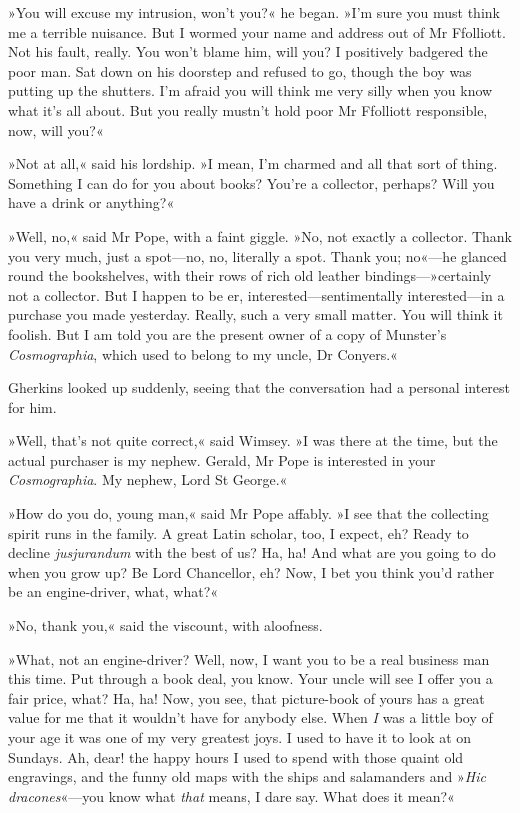 »You will excuse my intrusion, won't you?« he began. »I'm sure you must think me a terrible nuisance. But I wormed your name and address out of Mr Ffolliott. Not his fault, really. You won't blame him, will you? I positively badgered the poor man. Sat down on his doorstep and refused to go, though the boy was putting up the shutters. I'm afraid you will think me very silly when you know what it's all about. But you really mustn't hold poor Mr Ffolliott responsible, now, will you?«

»Not at all,« said his lordship. »I mean, I'm charmed and all that sort of thing. Something I can do for you about books? You're a collector, perhaps? Will you have a drink or anything?«

»Well, no,« said Mr Pope, with a faint giggle. »No, not exactly a collector. Thank you very much, just a spot—no, no, literally a spot. Thank you; no«—he glanced round the bookshelves, with their rows of rich old leather bindings—»certainly not a collector. But I happen to be er, interested—sentimentally interested—in a purchase you made yesterday. Really, such a very small matter. You will think it foolish. But I am told you are the present owner of a copy of Munster's \textit{Cosmographia}, which used to belong to my uncle, Dr Conyers.«

Gherkins looked up suddenly, seeing that the conversation had a personal interest for him.

»Well, that's not quite correct,« said Wimsey. »I was there at the time, but the actual purchaser is my nephew. Gerald, Mr Pope is interested in your \textit{Cosmographia}. My nephew, Lord St George.«

»How do you do, young man,« said Mr Pope affably. »I see that the collecting spirit runs in the family. A great Latin scholar, too, I expect, eh? Ready to decline \textit{jusjurandum} with the best of us? Ha, ha! And what are you going to do when you grow up? Be Lord Chancellor, eh? Now, I bet you think you'd rather be an engine-driver, what, what?«

»No, thank you,« said the viscount, with aloofness.

»What, not an engine-driver? Well, now, I want you to be a real business man this time. Put through a book deal, you know. Your uncle will see I offer you a fair price, what? Ha, ha! Now, you see, that picture-book of yours has a great value for me that it wouldn't have for anybody else. When \textit{I} was a little boy of your age it was one of my very greatest joys. I used to have it to look at on Sundays. Ah, dear! the happy hours I used to spend with those quaint old engravings, and the funny old maps with the ships and salamanders and »\textit{Hic dracones}«—you know what \textit{that} means, I dare say. What does it mean?«


